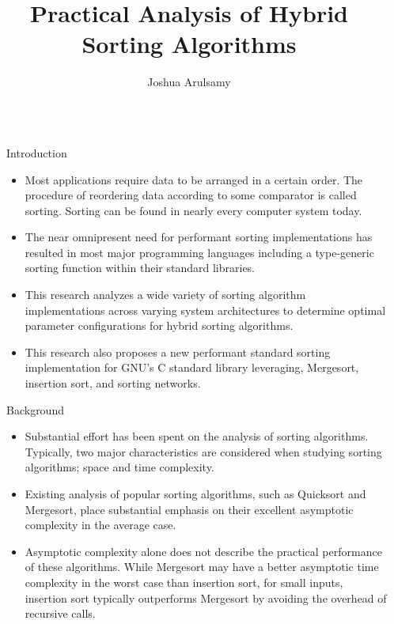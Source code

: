 \documentclass[final]{beamer}
\title{Practical Analysis of Hybrid Sorting Algorithms}
\author{Joshua Arulsamy}
\institute[shortinst]{Department of Electrical Engineering and Computer Science, University of Wyoming}
\newlength{\sepwidth}
\newlength{\colwidth}
\newcommand{\separatorcolumn}{\begin{column}{\sepwidth}\end{column}}
\begin{document}

\begin{frame}[t]
	\begin{columns}[t]
		\separatorcolumn

		\begin{column}{\colwidth}

			\begin{block}{Introduction}
				\begin{itemize}
					\item Most applications require data to be arranged in a certain order.
					      The procedure of reordering data according to some comparator is
					      called sorting. Sorting can be found in nearly every computer
					      system today.
					\item The near omnipresent need for
					      performant sorting implementations has resulted in most major
					      programming languages including a type-generic sorting function
					      within their standard libraries.
					\item This research analyzes a wide variety of sorting
					      algorithm implementations across varying system architectures to
					      determine optimal parameter configurations for hybrid sorting
					      algorithms.
					\item This research also proposes a new performant standard
					      sorting implementation for GNU's C standard library
					      leveraging, Mergesort, insertion sort, and sorting
					      networks.
				\end{itemize}
			\end{block}

			\begin{block}{Background}
				\begin{itemize}
					\item Substantial effort has been spent on the analysis of
					      sorting algorithms. Typically, two major characteristics
					      are considered when studying sorting algorithms; space
					      and time complexity\parencite{Bentley1993EngineeringAS}.
					\item Existing analysis of popular sorting algorithms, such as Quicksort
					      and Mergesort, place substantial emphasis on their excellent
					      asymptotic complexity in the average case\parencite{glibc}.
					\item Asymptotic complexity alone does not describe the
					      practical performance of these algorithms. While Mergesort may
					      have a better asymptotic time complexity in the worst case than
					      insertion sort, for small inputs, insertion sort typically
					      outperforms Mergesort by avoiding the overhead of recursive calls.
				\end{itemize}
			\end{block}


\end{column}
\end{columns}
\end{frame}
\end{document}
